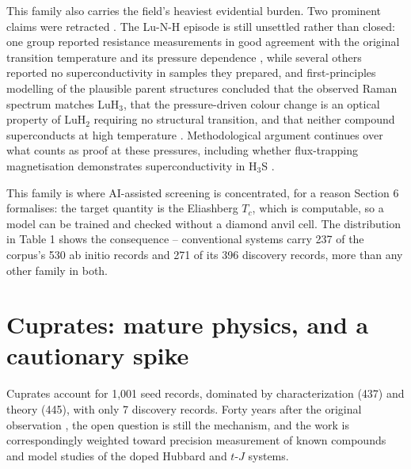 \documentclass[
  11pt,
]{article}
\begin{document}
This family also carries the field's heaviest evidential burden. Two
prominent claims were retracted
\citep{snider2020retracted, dasenbrock2023retracted}. The Lu-N-H episode
is still unsettled rather than closed: one group reported resistance
measurements in good agreement with the original transition temperature
and its pressure dependence \citep{salke2023evidence}, while several
others reported no superconductivity in samples they prepared, and
first-principles modelling of the plausible parent structures concluded
that the observed Raman spectrum matches LuH\(_3\), that the
pressure-driven colour change is an optical property of LuH\(_2\)
requiring no structural transition, and that neither compound
superconducts at high temperature \citep{dangic2023ab}. Methodological
argument continues over what counts as proof at these pressures,
including whether flux-trapping magnetisation demonstrates
superconductivity in H\(_3\)S \citep{tallon2024flux}.

This family is where AI-assisted screening is concentrated, for a reason
Section 6 formalises: the target quantity is the Eliashberg \(T_c\),
which is computable, so a model can be trained and checked without a
diamond anvil cell. The distribution in Table 1 shows the consequence --
conventional systems carry 237 of the corpus's 530 ab initio records and
271 of its 396 discovery records, more than any other family in both.

\section{Cuprates: mature physics, and a cautionary
spike}\label{cuprates-mature-physics-and-a-cautionary-spike}

Cuprates account for 1,001 seed records, dominated by characterization
(437) and theory (445), with only 7 discovery records. Forty years after
the original observation \citep{bednorz1986possible}, the open question
is still the mechanism, and the work is correspondingly weighted toward
precision measurement of known compounds and model studies of the doped
Hubbard and \(t\)-\(J\) systems.
\end{document}

